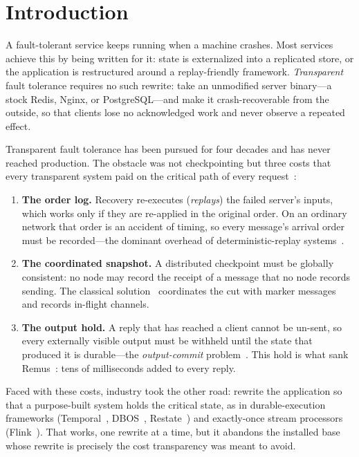 
\section{Introduction}
\label{sec:intro}

A fault-tolerant service keeps running when a machine crashes. Most
services achieve this by being written for it: state is externalized into
a replicated store, or the application is restructured around a
replay-friendly framework. \emph{Transparent} fault tolerance requires no
such rewrite: take an unmodified server binary---a stock Redis, Nginx, or
PostgreSQL---and make it crash-recoverable from the outside, so that
clients lose no acknowledged work and never observe a repeated effect.

Transparent fault tolerance has been pursued for four decades and has
never reached production. The obstacle was not checkpointing but three
costs that every transparent system paid on the critical path of every
request~\citep{elnozahy2002survey}:
\begin{enumerate}[leftmargin=1.4em,itemsep=1pt,topsep=2pt]
\item \textbf{The order log.} Recovery re-executes (\emph{replays}) the
  failed server's inputs, which works only if they are re-applied in the
  original order. On an ordinary network that order is an accident of
  timing, so every message's arrival order must be recorded---the dominant
  overhead of deterministic-replay
  systems~\citep{mashtizadeh2017castor,ocallahan2017rr}.
\item \textbf{The coordinated snapshot.} A distributed checkpoint must be
  globally consistent: no node may record the receipt of a message that no
  node records sending. The classical
  solution~\citep{chandy1985snapshots} coordinates the cut with marker
  messages and records in-flight channels.
\item \textbf{The output hold.} A reply that has reached a client cannot
  be un-sent, so every externally visible output must be withheld until
  the state that produced it is durable---the \emph{output-commit}
  problem~\citep{strom1985optimistic}. This hold is what sank
  Remus~\citep{cully2008remus}: tens of milliseconds added to every reply.
\end{enumerate}
Faced with these costs, industry took the other road: rewrite the
application so that a purpose-built system holds the critical state, as in
durable-execution frameworks (Temporal~\citep{temporal},
DBOS~\citep{skiadopoulos2021dbos}, Restate~\citep{restate}) and
exactly-once stream processors (Flink~\citep{carbone2015flink}). That
works, one rewrite at a time, but it abandons the installed base whose
rewrite is precisely the cost transparency was meant to avoid.

